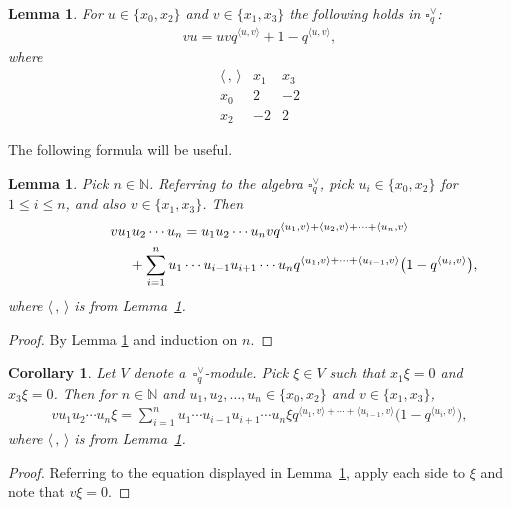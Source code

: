 \documentclass[pdftex]{sigma}
\numberwithin{equation}{section}
\newtheorem{Corollary}[Theorem]{Corollary}
\newtheorem{Lemma}[Theorem]{Lemma}
\begin{document}
\begin{Lemma} \label{lem:unif}For $u \in \lbrace x_0, x_2\rbrace$ and $v \in \lbrace x_1, x_3\rbrace$ the following holds in $\square^\vee_q$:
\begin{gather*}
v u = uv q^{\langle u,v\rangle} + 1-q^{\langle u,v\rangle},
\end{gather*}
where
\[
\begin{array}{c|cc}
\langle\,,\,\rangle & x_1 & x_3 \\ \hline
x_0 &2 & -2 \\
x_2 & -2 & 2
 \end{array}
\]
\end{Lemma}

The following formula will be useful.
\begin{Lemma}\label{lem:formula}Pick $n \in \mathbb N$. Referring to the algebra $\square^\vee_q$, pick
$u_i\in\lbrace x_0, x_2\rbrace$ for $1 \leq i \leq n$, and also $v \in \lbrace x_1, x_3\rbrace $. Then
\begin{gather*}
v u_1u_2\cdots u_n = u_1 u_2 \cdots u_n v q^{ \langle u_1,v\rangle+\langle u_2,v\rangle+\cdots+
\langle u_n,v\rangle}\\
\hphantom{v u_1u_2\cdots u_n =}{} + \sum_{i=1}^n u_1\cdots u_{i-1} u_{i+1} \cdots u_n
q^{\langle u_1,v\rangle+\cdots + \langle u_{i-1},v\rangle}\big(1-q^{\langle u_i,v\rangle}\big),
\end{gather*}
where $\langle \,,\,\rangle$ is from Lemma~{\rm \ref{lem:unif}}.
\end{Lemma}
\begin{proof} By Lemma \ref{lem:unif} and induction on $n$.
\end{proof}

\begin{Corollary}\label{cor:modW}Let $V$ denote a~$\square^\vee_q$-module. Pick $\xi \in V$ such that $x_1 \xi = 0$ and $x_3 \xi = 0$. Then for $n \in \mathbb N$ and $u_1, u_2, \ldots, u_n \in\lbrace x_0, x_2\rbrace$ and $v \in \lbrace x_1, x_3\rbrace $,
\begin{gather*}
 v u_1u_2\cdots u_n \xi =\sum_{i=1}^n u_1\cdots u_{i-1} u_{i+1} \cdots u_n \xi
q^{\langle u_1,v\rangle+\cdots + \langle u_{i-1},v\rangle}\big(1-q^{\langle u_i,v\rangle}\big),
\end{gather*}
where $\langle \,,\,\rangle$ is from Lemma~{\rm \ref{lem:unif}}.
\end{Corollary}
\begin{proof} Referring to the equation displayed in Lemma~\ref{lem:formula}, apply each side to $\xi$ and note that $v\xi =0$.
\end{proof}
\end{document}

